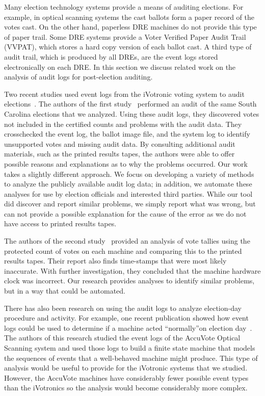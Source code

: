 Many election technology systems provide a means of auditing elections. For example, in optical scanning systems the cast ballots form a paper record of the votes cast.  On the other hand, paperless DRE machines do not provide this type of paper trail. Some DRE systems provide a Voter Verified Paper Audit Trail (VVPAT), which stores a hard copy version of each ballot cast.  A third type of audit trail, which is produced by all DREs, are the event logs stored electronically on each DRE.  In this section we discuss related work on the analysis of audit logs for post-election auditing. 

Two recent studies used event logs from the iVotronic voting system to audit
elections~\cite{Buell2011,Sandler2007}. The authors of the first
study~\cite{Buell2011} performed an audit of the same South Carolina elections
that we analyzed. Using these audit logs, they discovered votes not included in
the certified counts and problems with the audit data. They crosschecked the
event log, the ballot image file, and the system log to identify unsupported
votes and missing audit data.  By consulting additional audit materials, such as
the printed results tapes, the authors were able to offer possible reasons and
explanations as to why the problems occurred. Our work takes a slightly
different approach.  We focus on developing a variety of methods to analyze the
publicly available audit log data; in addition, we automate these analyses for
use by election officials and interested third parties.  While our tool did
discover and report similar problems, we simply report what was wrong, but can
not provide a possible explanation for the cause of the error as we do not have
access to printed results tapes.  

The authors of the second study~\cite{Sandler2007} provided an analysis of vote tallies using the protected count of votes on each machine and comparing this to the printed results tapes. Their report also finds time-stamps that were most likely inaccurate.  With further investigation, they concluded that the machine hardware clock was incorrect. Our research provides analyses to identify similar problems, but in a way that could be automated. 

There has also been research on using the audit logs to analyze election-day procedure and activity. For example, one recent publication showed how event logs could be used to determine if a machine acted \textquotedblleft normally\textquotedblright on election day~\cite{Antonyan2009}. The authors of this research studied the event logs of the AccuVote Optical Scanning system and used those logs to build a finite state machine that models the sequences of events that a well-behaved machine might produce. This type of analysis would be useful to provide for the iVotronic systems that we studied. However, the AccuVote machines have considerably fewer possible event types than the iVotronics so the analysis would become considerably more complex. 

